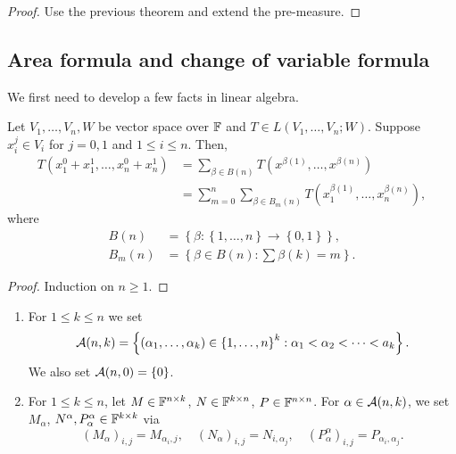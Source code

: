 \documentclass[a4paper]{article}
\begin{document}
\begin{proof}
Use the previous theorem and extend the pre-measure.
\end{proof}

\subsection{Area formula and change of variable formula}

We first need to develop a few facts in linear algebra.

\begin{prop}
Let $V_1, \dots, V_n, W$ be vector space over $\mathbb{F}$ 
and $T \in L(V_1, \dots, V_n ; W)$. Suppose $x_i^j \in V_i$
for $j = 0, 1$ and $1 \leq i \leq n$. Then, 
\[
\begin{aligned}
  T(x^0_1 + x^1_1, \dots, x^0_n + x^1_n)
  &= \sum_{\beta \in B(n)} 
  T(x^{\beta(1)}, \dots, x^{\beta(n)}) \\
  &= \sum_{m=0}^n \sum_{\beta \in B_m(n)} 
  T(x_1^{\beta(1)}, \dots, x_n^{\beta(n)}),
\end{aligned}
\]
where 
\[
\begin{aligned}
  B(n) &= \left\{ \beta : \left\{ 1, \dots, n \right\} 
  \to \left\{ 0, 1 \right\} \right\}, \\
  B_m(n) &= \left\{ \beta \in B(n) : 
  \sum \beta(k) = m \right\}.
\end{aligned}
\]
\end{prop}

\begin{proof}
Induction on $n \geq 1$.
\end{proof}

\begin{defi}
\begin{enumerate}
\item For $1 \leq k \leq n$ we set 
\[
\mathcal{A}(n, k) = \left\{ (\alpha_1, \dots, \alpha_k)  
\in \left\{ 1, \dots, n \right\}^k : 
\alpha_1 < \alpha_2 < \dots < a_k \right\}.
\]
We also set $\mathcal{A}(n, 0) = \left\{ 0 \right\}$. 

\item For $1 \leq k \leq n$, let $M \in \mathbb{F}^{n \times k}$, 
$N \in \mathbb{F}^{k \times n}$, $P \in \mathbb{F}^{n \times n}$. For 
$\alpha \in \mathcal{A}(n, k)$, we set 
$M_\alpha$, $N^\alpha, P_\alpha^\alpha \in \mathbb{F}^{k \times k}$
via 
\[
(M_\alpha)_{i, j} = M_{\alpha_i, j}, \quad 
(N_\alpha)_{i, j} = N_{i, \alpha_j}, \quad 
(P_\alpha^\alpha)_{i, j} = P_{\alpha_i, \alpha_j}.
\]
\end{enumerate}
\end{defi}
\end{document}
